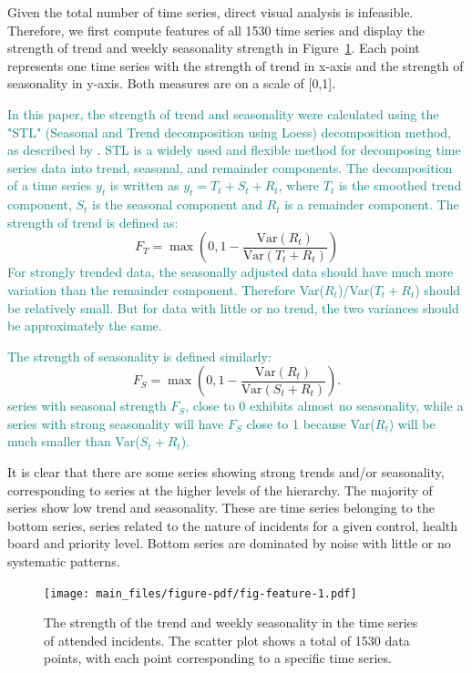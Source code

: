 \documentclass[
  authoryear,
  preprint,
  3p]{elsarticle}
\begin{document}
Given the total number of time series, direct visual analysis is
infeasible. Therefore, we first compute features of all 1530 time series
\citep{m3pca} and display the strength of trend and weekly seasonality
strength in Figure~\ref{fig-feature}. Each point represents one time
series with the strength of trend in x-axis and the strength of
seasonality in y-axis. Both measures are on a scale of {[}0,1{]}.

\textcolor{teal}{In this paper, the strength of trend and seasonality were calculated using the "STL" (Seasonal and Trend decomposition using Loess) decomposition method, as described by}
\citet{mstl}.
\textcolor{teal}{STL is a widely used and flexible method for decomposing time series data into trend, seasonal, and remainder components. The decomposition of a time series  $y_t$ is written as $y_t = T_t + S_{t} + R_t$, where $T_t$ is the smoothed trend component, $S_t$ is the seasonal component and $R_t$ is a remainder component. The strength of trend is defined as:}
\[F_T = \max\left(0, 1 - \frac{\text{Var}(R_t)}{\text{Var}(T_t+R_t)}\right)\]
\textcolor{teal}{For strongly trended data, the seasonally adjusted data should have much more variation than the remainder component. Therefore Var($R_t$)/Var($T_t+R_t$) should be relatively small. But for data with little or no trend, the two variances should be approximately the same.}

\textcolor{teal}{The strength of seasonality is defined similarly:}
\[F_S = \max\left(0, 1 - \frac{\text{Var}(R_t)}{\text{Var}(S_{t}+R_t)}\right).\]
\textcolor{teal}{series with seasonal strength  $F_S$, close to 0 exhibits almost no seasonality, while a series with strong seasonality will have $F_S$ close to 1 because Var($R_t$) will be much smaller than Var($S_t+R_t$).}

It is clear that there are some series showing strong trends and/or
seasonality, corresponding to series at the higher levels of the
hierarchy. The majority of series show low trend and seasonality. These
are time series belonging to the bottom series, series related to the
nature of incidents for a given control, health board and priority
level. Bottom series are dominated by noise with little or no systematic
patterns.

\begin{figure}

{\centering \texttt{[image: main\_files/figure-pdf/fig-feature-1.pdf]}

}

\caption{\label{fig-feature}The strength of the trend and weekly
seasonality in the time series of attended incidents. The scatter plot
shows a total of 1530 data points, with each point corresponding to a
specific time series.}

\end{figure}
\end{document}
